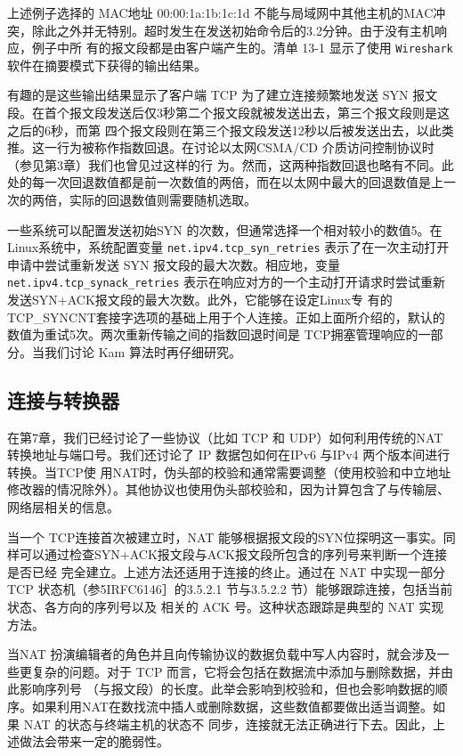 上述例子选择的 MAC地址 00:00:1a:1b:1c:1d 不能与局域网中其他主机的MAC冲突，除此之外并无特别。超时发生在发送初始命令后的3.2分钟。由于没有主机响应，例子中所
有的报文段都是由客户端产生的。清单 13-1 显示了使用 \verb|Wireshark| 软件在摘要模式下获得的输出结果。

有趣的是这些输出结果显示了客户端 TCP 为了建立连接频繁地发送 SYN 报文段。在首个报文段发送后仅3秒第二个报文段就被发送出去，第三个报文段则是这之后的6秒，而第
四个报文段则在第三个报文段发送12秒以后被发送出去，以此类推。这一行为被称作指数回退。在讨论以太网CSMA/CD 介质访问控制协议时（参见第3章）我们也曾见过这样的行
为。然而，这两种指数回退也略有不同。此处的每一次回退数值都是前一次数值的两倍，而在以太网中最大的回退数值是上一次的两倍，实际的回退数值则需要随机选取。

一些系统可以配置发送初始SYN 的次数，但通常选择一个相对较小的数值5。在Linux系统中，系统配置变量 \verb|net.ipv4.tcp_syn_retries| 表示了在一次主动打开申请中尝试重新发送
SYN 报文段的最大次数。相应地，变量\verb|net.ipv4.tcp_synack_retries| 表示在响应对方的一个主动打开请求时尝试重新发送SYN+ACK报文段的最大次数。此外，它能够在设定Linux专
有的TCP\_SYNCNT套接字选项的基础上用于个人连接。正如上面所介绍的，默认的数值为重试5次。两次重新传输之间的指数回退时间是 TCP拥塞管理响应的一部分。当我们讨论
Kam 算法时再仔细研究。
\subsection{连接与转换器}
在第7章，我们已经讨论了一些协议（比如 TCP 和 UDP）如何利用传统的NAT 转换地址与端口号。我们还讨论了 IP 数据包如何在IPv6 与IPv4 两个版本间进行转换。当TCP使
用NAT时，伪头部的校验和通常需要调整（使用校验和中立地址修改器的情况除外）。其他协议也使用伪头部校验和，因为计算包含了与传输层、网络层相关的信息。

当一个 TCP连接首次被建立时，NAT 能够根据报文段的SYN位探明这一事实。同样可以通过检查SYN+ACK报文段与ACK报文段所包含的序列号来判断一个连接是否已经
完全建立。上述方法还适用于连接的终止。通过在 NAT 中实现一部分TCP 状态机（参5IRFC6146］的3.5.2.1 节与3.5.2.2 节）能够跟踪连接，包括当前状态、各方向的序列号以及
相关的 ACK 号。这种状态跟踪是典型的 NAT 实现方法。

当NAT 扮演编辑者的角色并且向传输协议的数据负载中写人内容时，就会涉及一些更复杂的问题。对于 TCP 而言，它将会包括在数据流中添加与删除数据，并由此影响序列号
（与报文段）的长度。此举会影响到校验和，但也会影响数据的顺序。如果利用NAT在数找流中插人或删除数据，这些数值都要做出适当调整。如果 NAT 的状态与终端主机的状态不
同步，连接就无法正确进行下去。因此，上述做法会带来一定的脆弱性。

